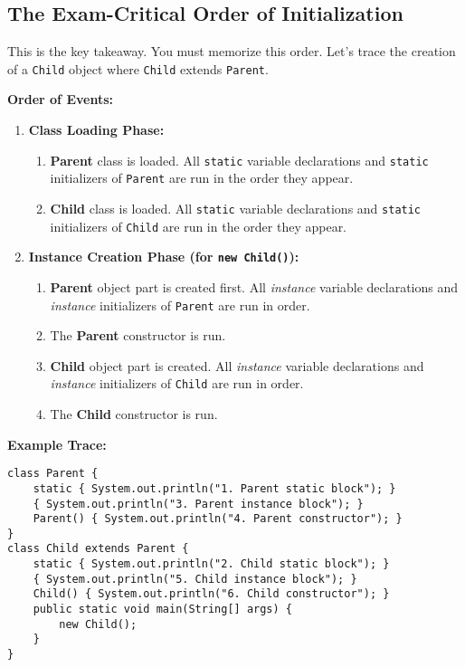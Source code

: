 \documentclass[12pt]{article}
\begin{document}
\begin{enumerate}[label=(\arabic*)]
\section{The Exam-Critical Order of Initialization}
This is the key takeaway. You must memorize this order. Let's trace the creation of a \texttt{Child} object where \texttt{Child} extends \texttt{Parent}.

\textbf{Order of Events:}
\begin{enumerate}
    \item \textbf{Class Loading Phase:}
    \begin{enumerate}
        \item \textbf{Parent} class is loaded. All \texttt{static} variable declarations and \texttt{static} initializers of \texttt{Parent} are run in the order they appear.
        \item \textbf{Child} class is loaded. All \texttt{static} variable declarations and \texttt{static} initializers of \texttt{Child} are run in the order they appear.
    \end{enumerate}
    \item \textbf{Instance Creation Phase (for \texttt{new Child()}):}
    \begin{enumerate}
        \item \textbf{Parent} object part is created first. All \textit{instance} variable declarations and \textit{instance} initializers of \texttt{Parent} are run in order.
        \item The \textbf{Parent} constructor is run.
        \item \textbf{Child} object part is created. All \textit{instance} variable declarations and \textit{instance} initializers of \texttt{Child} are run in order.
        \item The \textbf{Child} constructor is run.
    \end{enumerate}
\end{enumerate}

\textbf{Example Trace:}
\begin{verbatim}
class Parent {
    static { System.out.println("1. Parent static block"); }
    { System.out.println("3. Parent instance block"); }
    Parent() { System.out.println("4. Parent constructor"); }
}
class Child extends Parent {
    static { System.out.println("2. Child static block"); }
    { System.out.println("5. Child instance block"); }
    Child() { System.out.println("6. Child constructor"); }
    public static void main(String[] args) {
        new Child();
    }
}
\end{verbatim}


\end{enumerate}
\end{document}
